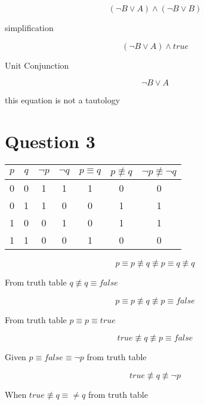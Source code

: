 \documentclass[10pt,a4paper]{article}
\begin{document}
\begin{equation}
(\neg B \vee A) \wedge (\neg B \vee B) 
\end{equation}

simplification

\begin{equation}
(\neg B \vee A) \wedge true 
\end{equation}

Unit Conjunction 

\begin{equation}
\neg B \vee A 
\end{equation}

this equation is not a tautology

\section{Question 3}


\begin{tabular}{|c|c|c|c|c|c|c|}
 \hline
 $p$ & $q$ & $\neg p$& $\neg q$& $p\equiv q$ & $p \not\equiv q$ &$\neg p \not\equiv \neg q$\\
 \hline
 0 &0&1&1&1&0&0  \\
 0 &1&1&0&0&1&1  \\
 1 &0&0&1&0&1&1  \\
 1 &1&0&0&1&0&0  \\
 \hline
\end{tabular}


\begin{equation}
 p\equiv p \not \equiv q \not\equiv p \equiv q \not \equiv q
\end{equation}

From truth table $q \not\equiv q \equiv false$

\begin{equation}
 p\equiv p \not \equiv q \not\equiv p \equiv false
\end{equation}

From truth table $p \equiv p \equiv true$

\begin{equation}
true \not \equiv q \not\equiv p \equiv false
\end{equation}

Given $p \equiv false \equiv \neg p$ from truth table

\begin{equation}
true \not \equiv q \not\equiv \neg p
\end{equation}

When $true \not\equiv q \equiv \neq q$ from truth table
\end{document}
